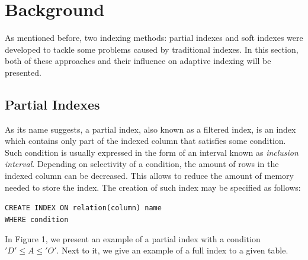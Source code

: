 \documentclass[10pt, conference, compsocconf]{IEEEtran}
\begin{document}
\section{Background}
\label{sec:background}
As mentioned before, two indexing methods: partial indexes \cite{partial1} and soft indexes \cite{soft_indexes} were developed to tackle some problems caused by traditional indexes. In this section, both of these approaches and their influence on adaptive indexing will be presented.
\subsection{Partial Indexes}
\label{subsec:partial}
As its name suggests, a partial index, also known as a filtered index, is an index which contains only part of the indexed column that satisfies some condition. Such condition is usually expressed in the form of an interval known as \emph{inclusion interval}. Depending on selectivity of a condition, the amount of rows in the indexed column can be decreased. This allows to reduce the amount of memory needed to store the index. The creation of such index may be specified as follows:
\begin{displayquote}
\texttt{CREATE \hspace{0.2 cm} INDEX \hspace{0.2 cm} ON \hspace{0.2 cm} relation(column) name \\ WHERE \hspace{0.2 cm} condition}
\end{displayquote}

In Figure 1, we present an example of a partial index with a condition $'D' \leq A \leq 'O'$. Next to it, we give an example of a full index to a given table.
\end{document}
